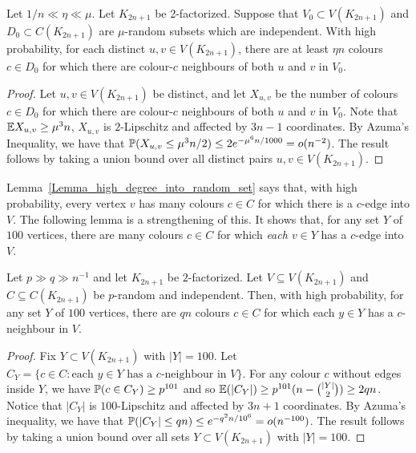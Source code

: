 \begin{lemma}\label{lem:goodpairs} Let $1/n\ll \eta \ll \mu$. Let $K_{2n+1}$ be 2-factorized. Suppose that $V_0\subset V(K_{2n+1})$ and $D_0\subset C(K_{2n+1})$ are $\mu$-random subsets which are independent. With high probability, for each distinct $u,v\in V(K_{2n+1})$, there are at least $\eta n$ colours $c\in D_0$ for which there are colour-$c$ neighbours of both $u$ and $v$ in $V_0$.
\end{lemma}
\begin{proof} Let $u,v\in V(K_{2n+1})$ be distinct, and let $X_{u,v}$ be the number of colours $c\in D_0$ for which there are colour-$c$ neighbours of both $u$ and $v$ in $V_0$. Note that $\E X_{u,v} \geq \mu^3 n$, $X_{u,v}$ is
$2$-Lipschitz and affected by $3n-1$ coordinates.
By Azuma's Inequality, we have that $\P(X_{u,v}\leq \mu^3 n/2)\leq 2e^{-\mu^6 n/1000}= o(n^{-2})$. The result follows by taking a union bound over all distinct pairs $u,v\in V(K_{2n+1})$.
\end{proof}







Lemma~\ref{Lemma_high_degree_into_random_set} says that, with high probability, every vertex $v$ has many colours $c\in C$ for which there is a $c$-edge into $V$. The following lemma is a strengthening of this. It shows that, for any set $Y$ of $100$ vertices, there are many colours $c\in C$ for which \emph{each $v\in Y$} has a $c$-edge into $V$.
\begin{lemma}\label{Lemma_edges_into_independent_vertexcolour_sets} 
Let $p\gg q\gg n^{-1}$ and  let  $K_{2n+1}$ be $2$-factorized.
Let $V\subseteq V(K_{2n+1})$ and $C\subseteq C(K_{2n+1})$ be $p$-random and independent.
Then, with high probability, for any set $Y$ of $100$ vertices, there are $qn$ colours $c\in C$ for which each $y\in Y$ has a $c$-neighbour in $V$.
\end{lemma}
\begin{proof} Fix $Y\subset V(K_{2n+1})$ with $|Y|=100$.
Let $C_Y=\{c\in C: \mbox{each $y\in Y$ has a $c$-neighbour in $V$}\}$.
For any colour $c$ without edges inside $Y$, we have $\P(c\in C_Y)\geq p^{101}$ and so $\E(|C_Y|)\geq p^{101}(n-\binom{|Y|}2)\geq 2qn$. Notice that $|C_Y|$ is $100$-Lipschitz and affected by $3n+1$ coordinates.
By Azuma's inequality, we have that $\P(|C_Y|\leq qn)\leq e^{-q^2n/10^6}= o(n^{-100})$. The result follows by taking a union bound over all sets $Y\subset V(K_{2n+1})$ with $|Y|=100$.
\end{proof}


